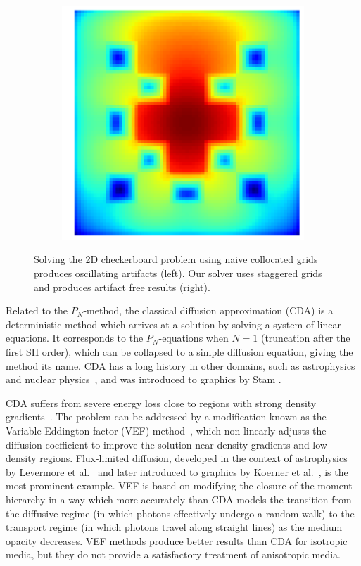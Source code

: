 \documentclass{egpubl}
\newcommand{\icaption}[1]{\caption{#1}}
\begin{document}
\begin{figure}[t]
\begin{subfigure}{0.45\columnwidth}
\includegraphics[width=\columnwidth]{checkerboard2d_p1_staggered.png}
\end{subfigure}%
\icaption{Solving the 2D checkerboard problem using naive collocated grids produces oscillating artifacts (left). Our solver uses staggered grids and produces artifact free results (right). \vspace{-0.1in}}
\label{fig:artifacts}
\end{figure}

Related to the $P_N$-method, the classical diffusion approximation (CDA) is a deterministic method which arrives at a solution by solving a system of linear equations. It corresponds to the $P_N$-equations when $N=1$ (truncation after the first SH order), which can be collapsed to a simple diffusion equation, giving the method its name. CDA has a long history in other domains, such as astrophysics and nuclear physics~\cite{Brunner02}, and was introduced to graphics by Stam \cite{Stam95}.

CDA suffers from severe energy loss close to regions with strong density gradients~\cite{Koerner14}. The problem can be addressed by a modification known as the Variable Eddington factor (VEF) method~\cite{Brunner02}, which non-linearly adjusts the diffusion coefficient to improve the solution near density gradients and low-density regions. Flux-limited diffusion, developed in the context of astrophysics by Levermore et al.~\cite{Levermore81} and later introduced to graphics by Koerner et al.~\cite{Koerner14}, is the most prominent example.
VEF is based on modifying the closure of the moment hierarchy in a way which more accurately than CDA models the transition from the diffusive regime (in which photons effectively undergo a random walk) to the transport regime (in which photons travel along straight lines) as the medium opacity decreases. VEF methods produce better results than CDA for isotropic media, but they do not provide a satisfactory treatment of anisotropic media.
\end{document}
